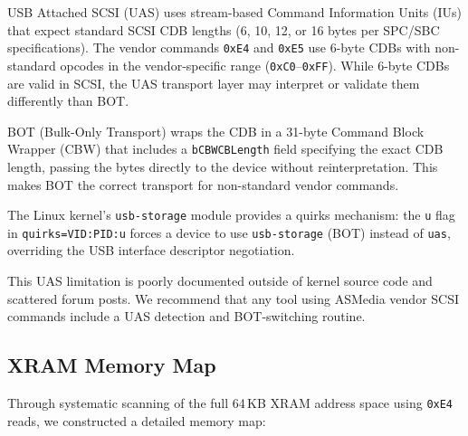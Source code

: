 \documentclass[conference]{IEEEtran}
\begin{document}
USB Attached SCSI (UAS) uses stream-based Command Information Units
(IUs) that expect standard SCSI CDB lengths (6, 10, 12, or 16 bytes
per SPC/SBC specifications). The vendor commands \texttt{0xE4} and
\texttt{0xE5} use 6-byte CDBs with non-standard opcodes in the
vendor-specific range (\texttt{0xC0}--\texttt{0xFF}). While 6-byte CDBs
are valid in SCSI, the UAS transport layer may interpret or validate them
differently than BOT.

BOT (Bulk-Only Transport) wraps the CDB in a 31-byte Command Block
Wrapper (CBW) that includes a \texttt{bCBWCBLength} field specifying the
exact CDB length, passing the bytes directly to the device without
reinterpretation. This makes BOT the correct transport for
non-standard vendor commands.

The Linux kernel's \texttt{usb-storage} module provides a quirks
mechanism: the \texttt{u} flag in \texttt{quirks=VID:PID:u} forces a
device to use \texttt{usb-storage} (BOT) instead of \texttt{uas},
overriding the USB interface descriptor negotiation.

This UAS limitation is poorly documented outside of kernel source code
and scattered forum posts. We recommend that any tool using ASMedia
vendor SCSI commands include a UAS detection and BOT-switching routine.


\subsection{XRAM Memory Map}
\label{sec:xram-map}

Through systematic scanning of the full 64\,KB XRAM address space using
\texttt{0xE4} reads, we constructed a detailed memory map:
\end{document}
